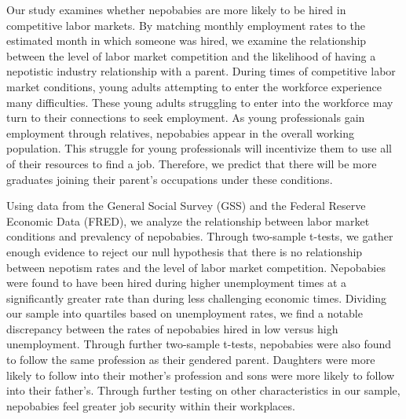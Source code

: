 \documentclass[12pt]{article}
\begin{document}
Our study examines whether nepobabies are more likely to be hired in competitive labor markets. By matching monthly employment rates to the estimated month in which someone was hired, we examine the relationship between the level of labor market competition and the likelihood of having a nepotistic industry relationship with a parent.
During times of competitive labor market conditions, young adults attempting to enter the workforce experience many difficulties. These young adults struggling to enter into the workforce may turn to their connections to seek employment. As young professionals gain employment through relatives, nepobabies appear in the overall working population. This struggle for young professionals will incentivize them to use all of their resources to find a job. Therefore, we predict that there will be more graduates joining their parent’s occupations under these conditions. 


Using data from the General Social Survey (GSS) and the Federal Reserve Economic Data (FRED), we analyze the relationship between labor market conditions and prevalency of nepobabies. Through two-sample t-tests, we gather enough evidence to reject our null hypothesis that there is no relationship between nepotism rates and the level of labor market competition. Nepobabies were found to have been hired during higher unemployment times at a significantly greater rate than during less challenging economic times. Dividing our sample into  quartiles based on unemployment rates, we find a notable discrepancy between the rates of nepobabies hired in low versus high unemployment. Through further two-sample t-tests, nepobabies were also found to follow the same profession as their gendered parent. Daughters were more likely to follow into their mother's profession and sons were more likely to follow into their father's. Through further testing on other characteristics in our sample, nepobabies feel greater job security within their workplaces.
\end{document}
